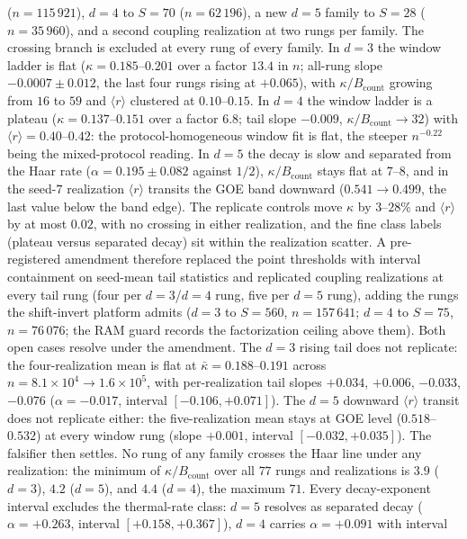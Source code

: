 \begin{remark}
($n=115\,921$), $d=4$ to $S=70$ ($n=62\,196$), a new $d=5$ family to
$S=28$ ($n=35\,960$), and a second coupling realization at two rungs per
family. The crossing branch is excluded at every rung of every family. In
$d=3$ the window ladder is flat ($\kappa=0.185$--$0.201$ over a factor
$13.4$ in $n$; all-rung slope $-0.0007\pm0.012$, the last four rungs
rising at $+0.065$), with $\kappa/B_{\mathrm{count}}$ growing from $16$
to $59$ and $\langle r\rangle$ clustered at $0.10$--$0.15$. In $d=4$ the
window ladder is a plateau ($\kappa=0.137$--$0.151$ over a factor $6.8$;
tail slope $-0.009$, $\kappa/B_{\mathrm{count}}\to32$) with $\langle
r\rangle=0.40$--$0.42$: the protocol-homogeneous window fit is flat, the
steeper $n^{-0.22}$ being the mixed-protocol reading. In $d=5$ the decay
is slow and separated from the Haar rate ($\alpha=0.195\pm0.082$
against $1/2$), $\kappa/B_{\mathrm{count}}$ stays flat at $7$--$8$, and
in the seed-$7$ realization $\langle r\rangle$ transits the GOE band
downward ($0.541\to0.499$, the last value below the band edge). The
replicate controls move
$\kappa$ by $3$--$28\%$ and $\langle r\rangle$ by at most $0.02$, with
no crossing in either realization, and the fine class labels (plateau
versus separated decay) sit within the realization scatter. A
pre-registered amendment therefore replaced the point thresholds with
interval containment on seed-mean tail statistics and replicated
coupling realizations at every tail rung (four per $d=3$/$d=4$ rung,
five per $d=5$ rung), adding the rungs the shift-invert platform admits
($d=3$ to $S=560$, $n=157\,641$; $d=4$ to $S=75$, $n=76\,076$; the RAM
guard records the factorization ceiling above them). Both open cases
resolve under the amendment. The $d=3$ rising tail does not replicate:
the four-realization mean is flat at $\bar\kappa=0.188$--$0.191$ across
$n=8.1\times10^{4}\to1.6\times10^{5}$, with per-realization tail slopes
$+0.034$, $+0.006$, $-0.033$, $-0.076$ ($\alpha=-0.017$, interval
$[-0.106,+0.071]$). The $d=5$ downward $\langle r\rangle$ transit does
not replicate either: the five-realization mean stays at GOE level
($0.518$--$0.532$) at every window rung (slope $+0.001$, interval
$[-0.032,+0.035]$). The falsifier then settles. No rung of any family
crosses the Haar line under any realization: the minimum of
$\kappa/B_{\mathrm{count}}$ over all $77$ rungs and realizations is
$3.9$ ($d=3$), $4.2$ ($d=5$), and $4.4$ ($d=4$), the maximum $71$.
Every decay-exponent interval excludes the thermal-rate class: $d=5$
resolves as separated decay ($\alpha=+0.263$, interval $[+0.158,
+0.367]$), $d=4$ carries $\alpha=+0.091$ with interval

\end{remark}
